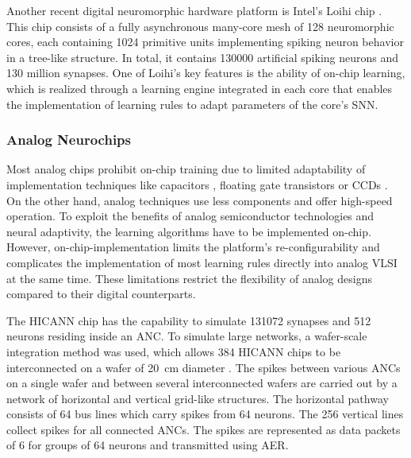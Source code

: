Another recent digital neuromorphic hardware platform is Intel's Loihi chip \parencite{Davies2018}.
This chip consists of a fully asynchronous many-core mesh of \num{128} neuromorphic cores, each containing \num{1024} primitive units implementing spiking neuron behavior in a tree-like structure.
In total, it contains \num{130000} artificial spiking neurons and \num{130} million synapses.
One of Loihi's key features is the ability of on-chip learning, which is realized through a learning engine integrated in each core that enables the implementation of learning rules to adapt parameters of the core's \ac{SNN}.

\subsubsection{Analog Neurochips}

Most analog chips prohibit on-chip training due to limited adaptability of implementation techniques like capacitors \parencite{Schwartz1990}, floating gate transistors \parencite{Holler1989} or \acp{CCD} \parencite{Agranat1990}.
On the other hand, analog techniques use less components and offer high-speed operation.
To exploit the benefits of analog semiconductor technologies and neural adaptivity, the learning algorithms have to be implemented on-chip.
However, on-chip-implementation limits the platform's re-configurability and complicates the implementation of most learning rules directly into analog \ac{VLSI} at the same time.
These limitations restrict the flexibility of analog designs compared to their digital counterparts.

The \ac{HICANN} chip \parencite{Schemmel2008} has the capability to simulate \num{131072} synapses and \num{512} neurons residing inside an \ac{ANC}.
To simulate large networks, a wafer-scale integration method was used, which allows \num{384} \ac{HICANN} chips to be interconnected on a wafer of \SI{20}{\centi\meter} diameter \parencite{Schemmel2010}.
The spikes between various \acp{ANC} on a single wafer and between several interconnected wafers are carried out by a network of horizontal and vertical grid-like structures.
The horizontal pathway consists of \num{64} bus lines which carry spikes from \num{64} neurons.
The \num{256} vertical lines collect spikes for all connected \acp{ANC}.
The spikes are represented as data packets of \SI{6}{\bit} for groups of \num{64} neurons and transmitted using \ac{AER}. 

